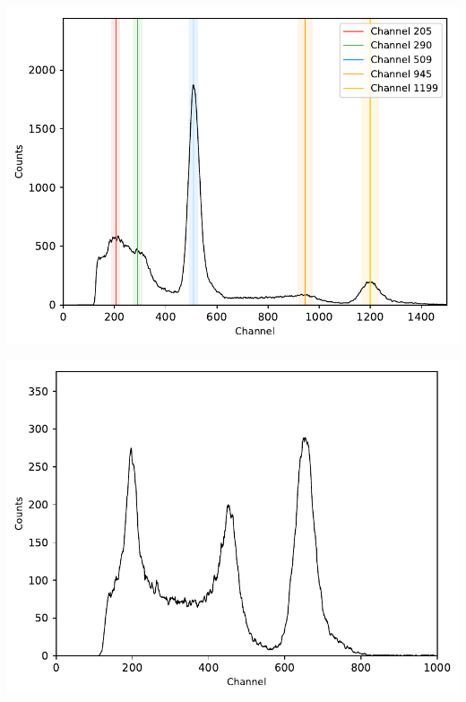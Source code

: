\begin{multicols}{2}
\begin{center}
\begin{adjustbox}{max width=\linewidth, keepaspectratio}
        \end{adjustbox}
        \label{fig:Spectrum137Cs}
    \end{center}
\endminipage
%
\vspace{10mm}
%
\minipage{\linewidth}
    \begin{center}
        \captionsetup{type=figure}
        \begin{adjustbox}{max width=\linewidth, keepaspectratio}
            \includegraphics[]{pdf/22Na}
        \end{adjustbox}
        \label{fig:Spectrum22Na}
    \end{center}
\endminipage
%
\vspace{10mm}
%
\minipage{\linewidth}
    \begin{center}
        \captionsetup{type=figure}
        \begin{adjustbox}{max width=\linewidth, keepaspectratio}
            \includegraphics[]{pdf/137Cskoinz1}

\end{adjustbox}
\end{center}
\end{multicols}
